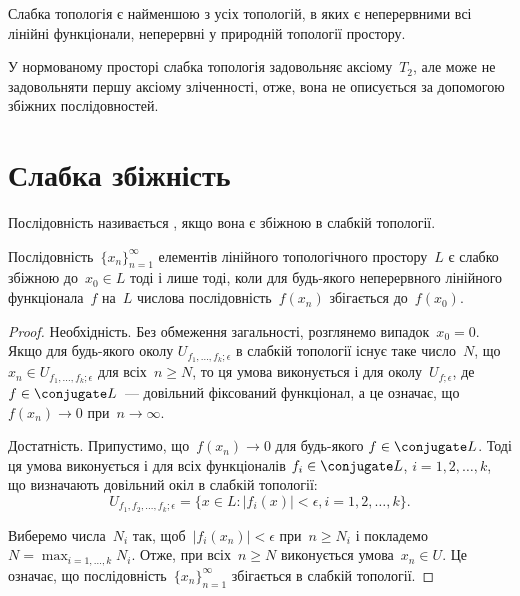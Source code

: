 \begin{remark}
Слабка топологія є найменшою з усіх
топологій, в яких є неперервними всі лінійні функціонали,
неперервні у природній топології простору.
\end{remark}

\begin{remark}
У нормованому просторі слабка
топологія задовольняє аксіому~$T_2$, але може не задовольняти
першу аксіому зліченності, отже, вона не описується за
допомогою збіжних послідовностей.
\end{remark}

\section{Слабка збіжність}

\begin{definition}
Послідовність 
називається ,
якщо вона є збіжною в слабкій топології.
\end{definition}

\begin{lemma}
Послідовність~$\{x_n\}_{n = 1}^\infty$
елементів лінійного топологічного простору~$L$ є слабко збіжною до~$x_0 \in L$ тоді
і лише тоді, коли для будь-якого неперервного лінійного
функціонала~$f$ на~$L$ числова послідовність~$f(x_n)$
збігається до~$f(x_0)$.
\end{lemma}

\begin{proof}
Необхідність. Без обмеження загальності,
розглянемо випадок~$x_0 = 0$. Якщо для будь-якого околу
$U_{f_1, \dots, f_k; \epsilon}$ в слабкій топології існує таке число~$N$, що
$x_n \in U_{f_1, \dots, f_k; \epsilon}$ для всіх~$n \ge N$, то ця умова виконується і для
околу~$U_{f;\epsilon}$, де~$f \in \conjugate L$~--- довільний фіксований функціонал, а
це означає, що~$f(x_n) \to 0$ при~$n \to \infty$.

Достатність. Припустимо, що~$f(x_n) \to 0$ для будь-якого
$f \in \conjugate L$. Тоді ця умова виконується і для всіх функціоналів
$f_i \in \conjugate L$, $i = 1, 2, \dots, k$, що визначають довільний окіл в слабкій
топології:
\begin{equation*}
    U_{f_1, f_2, \dots, f_k; \epsilon} =
    \{ x \in L: |f_i(x)| < \epsilon, i = 1, 2, \dots, k \}.
\end{equation*}

Виберемо числа~$N_i$ так, щоб~$|f_i(x_n)| < \epsilon$ при~$n \ge N_i$ і
покладемо~$N = \max_{i = 1, \dots, k} N_i$. Отже, при всіх~$n \ge N$ виконується
умова~$x_n \in U$. Це означає, що послідовність~$\{x_n\}_{n = 1}^\infty$
збігається в слабкій топології. 
\end{proof}

